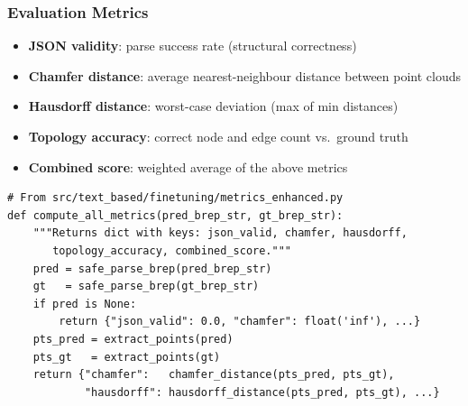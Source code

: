 \begin{frame}[fragile]\frametitle{Evaluation Metrics}
\begin{itemize}
\item \textbf{JSON validity}: parse success rate (structural correctness)
\item \textbf{Chamfer distance}: average nearest-neighbour distance between point clouds
\item \textbf{Hausdorff distance}: worst-case deviation (max of min distances)
\item \textbf{Topology accuracy}: correct node and edge count vs.\ ground truth
\item \textbf{Combined score}: weighted average of the above metrics
\end{itemize}
\begin{lstlisting}[basicstyle=\tiny]
# From src/text_based/finetuning/metrics_enhanced.py
def compute_all_metrics(pred_brep_str, gt_brep_str):
    """Returns dict with keys: json_valid, chamfer, hausdorff,
       topology_accuracy, combined_score."""
    pred = safe_parse_brep(pred_brep_str)
    gt   = safe_parse_brep(gt_brep_str)
    if pred is None:
        return {"json_valid": 0.0, "chamfer": float('inf'), ...}
    pts_pred = extract_points(pred)
    pts_gt   = extract_points(gt)
    return {"chamfer":   chamfer_distance(pts_pred, pts_gt),
            "hausdorff": hausdorff_distance(pts_pred, pts_gt), ...}
\end{lstlisting}
\end{frame}





